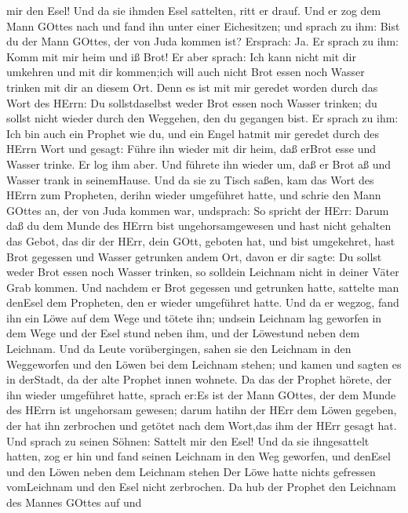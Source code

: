 mir den Esel! Und da sie ihmden Esel sattelten, ritt er drauf.
 Und er zog dem Mann GOttes nach und fand ihn unter einer
Eichesitzen; und sprach zu ihm: Bist du der Mann GOttes, der von Juda
kommen ist? Ersprach: Ja.  Er sprach zu ihm: Komm mit mir
heim und iß Brot!  Er aber sprach: Ich kann nicht mit dir
umkehren und mit dir kommen;ich will auch nicht Brot essen noch Wasser
trinken mit dir an diesem Ort.  Denn es ist mit mir geredet
worden durch das Wort des HErrn: Du sollstdaselbst weder Brot essen noch
Wasser trinken; du sollst nicht wieder durch den Weggehen, den du
gegangen bist.  Er sprach zu ihm: Ich bin auch ein Prophet
wie du, und ein Engel hatmit mir geredet durch des HErrn Wort und
gesagt: Führe ihn wieder mit dir heim, daß erBrot esse und Wasser
trinke. Er log ihm aber.  Und führete ihn wieder um, daß er
Brot aß und Wasser trank in seinemHause.  Und da sie zu
Tisch saßen, kam das Wort des HErrn zum Propheten, derihn wieder
umgeführet hatte,  und schrie den Mann GOttes an, der von
Juda kommen war, undsprach: So spricht der HErr: Darum daß du dem Munde
des HErrn bist ungehorsamgewesen und hast nicht gehalten das Gebot, das
dir der HErr, dein GOtt, geboten hat,  und bist umgekehret,
hast Brot gegessen und Wasser getrunken andem Ort, davon er dir sagte:
Du sollst weder Brot essen noch Wasser trinken, so solldein Leichnam
nicht in deiner Väter Grab kommen.  Und nachdem er Brot
gegessen und getrunken hatte, sattelte man denEsel dem Propheten, den er
wieder umgeführet hatte.  Und da er wegzog, fand ihn ein
Löwe auf dem Wege und tötete ihn; undsein Leichnam lag geworfen in dem
Wege und der Esel stund neben ihm, und der Löwestund neben dem Leichnam.
 Und da Leute vorübergingen, sahen sie den Leichnam in den
Weggeworfen und den Löwen bei dem Leichnam stehen; und kamen und sagten
es in derStadt, da der alte Prophet innen wohnete.  Da das
der Prophet hörete, der ihn wieder umgeführet hatte, sprach er:Es ist
der Mann GOttes, der dem Munde des HErrn ist ungehorsam gewesen; darum
hatihn der HErr dem Löwen gegeben, der hat ihn zerbrochen und getötet
nach dem Wort,das ihm der HErr gesagt hat.  Und sprach zu
seinen Söhnen: Sattelt mir den Esel! Und da sie ihngesattelt hatten,
 zog er hin und fand seinen Leichnam in den Weg geworfen,
und denEsel und den Löwen neben dem Leichnam stehen Der Löwe hatte
nichts gefressen vomLeichnam und den Esel nicht zerbrochen.
 Da hub der Prophet den Leichnam des Mannes GOttes auf und

